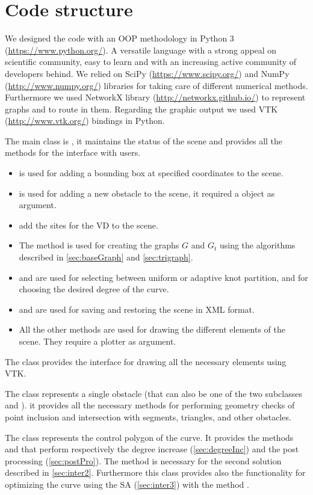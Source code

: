 \documentclass[dissertation.tex]{subfiles}
\begin{document}
\chapter{Code structure}\label{cha:codeStructure}
We designed the code with an \ac{OOP} methodology in Python 3
(\url{https://www.python.org/}). A versatile language with a strong
appeal on
scientific community, easy to learn and with an increasing active
community of developers behind. We
relied on SciPy (\url{https://www.scipy.org/}) and NumPy
(\url{http://www.numpy.org/}) libraries for taking care of
different numerical methods. Furthermore we used NetworkX library
(\url{http://networkx.github.io/}) to represent graphs and
to route in them. Regarding the graphic output we used \ac{VTK}
(\url{http://www.vtk.org/}) bindings in Python.

The main class is , it maintains the status of the
scene and provides all the methods for the interface with users.
\begin{itemize}
\item {} is used for adding a bounding box at specified
  coordinates to the scene.
\item {} is used for adding a new
  obstacle to the scene, it required a  object as
  argument.
\item {} add the sites for the \ac{VD} to the scene.
\item The method  is used for creating the graphs
  $G$ and $G_t$ using the algorithms described in \cref{sec:baseGraph}
  and \cref{sec:trigraph}.
\item {} and  are used for
  selecting between uniform or adaptive knot partition, and for choosing
  the desired degree of the curve.
\item {} and  are used for saving
  and restoring the scene in \acs{XML} format.
\item All the other methods  are used for drawing the
  different elements of the scene. They require a plotter as
  argument.
\end{itemize}

The class  provides the interface for drawing all the
necessary elements using \ac{VTK}.

The class  represents a single obstacle (that can also
be one of the two subclasses  and ). it
provides all the necessary methods for performing geometry checks of
point inclusion and intersection with segments, triangles, and other
obstacles.

The class  represents the control polygon of the curve. It
provides the methods  and  that
perform respectively the degree increase (\cref{sec:degreeInc}) and
the post processing (\cref{sec:postPro}). The method  is
necessary for the second solution described in
\cref{sec:inter2}. Furthermore this class provides also the
functionality for optimizing the curve using the \ac{SA}
(\cref{sec:inter3}) with the method .
\end{document}
